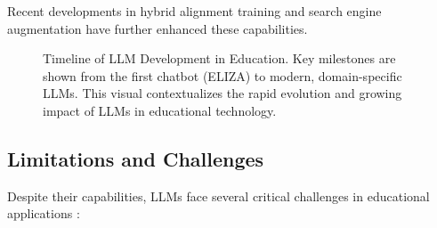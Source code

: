 Recent developments in hybrid alignment training \cite{wang2024hybrid} and search engine augmentation \cite{vu2024freshllms} have further enhanced these capabilities.

\begin{figure}[ht]
    \centering
    \caption{Timeline of LLM Development in Education. Key milestones are shown from the first chatbot (ELIZA) to modern, domain-specific LLMs. This visual contextualizes the rapid evolution and growing impact of LLMs in educational technology.}
    \label{fig:llm-timeline}
\end{figure}


\subsection{Limitations and Challenges}
Despite their capabilities, LLMs face several critical challenges in educational applications \cite{zhang2024survey}:

